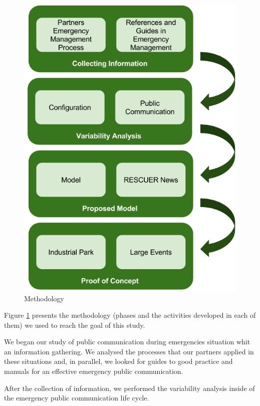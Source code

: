 \begin{figure}[ht!]
\begin{center}
  \includegraphics[width=0.98\linewidth, keepaspectratio]{images/Methodology.png}
\caption{Methodology}
\label{fig:methodology}
\end{center}
\end{figure}

Figure \ref{fig:methodology} presents the methodology (phases and the activities developed in each of them) we used to reach the goal of this study.

We began our study of public communication during emergencies situation whit an information gathering. We analysed the processes that our partners applied in these situations and, in parallel, we looked for guides to good practice and manuals for an effective emergency public communication.

After the collection of information, we performed the variability analysis inside of the emergency public communication life cycle.

